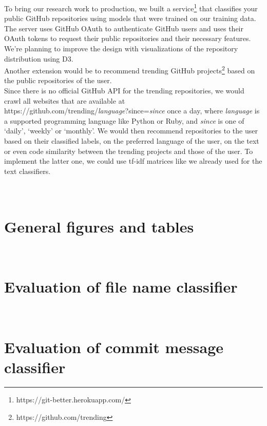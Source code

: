\documentclass[%
a4paper,
DIV12,
2.5headlines,
bigheadings,
titlepage,
openbib,
]{scrartcl}
\begin{document}
To bring our research work to production, we built a service\footnote{https://git-better.herokuapp.com/} that classifies your public GitHub repositories using models that were trained on our training data.
The server uses GitHub OAuth to authenticate GitHub users and uses their OAuth tokens to request their public repositories and their necessary features.
We're planning to improve the design with visualizations of the repository distribution using D3.\\
Another extension would be to recommend trending GitHub projects\footnote{https://github.com/trending} based on the public repositories of the user.\\
Since there is no official GitHub API for the trending repositories, we would crawl all websites that are available at \\
https://github.com/trending/\textit{language}?since=\textit{since} once a day, where \textit{language} is a supported programming language like Python or Ruby, and \textit{since} is one of `daily', `weekly' or `monthly'.
We would then recommend repositories to the user based on their classified labels, on the preferred language of the user, on the text or even code similarity between the trending projects and those of the user.
To implement the latter one, we could use tf-idf matrices like we already used for the text classifiers.


\newpage
\appendix
\section{\\General figures and tables} \label{App:AppendixA}

\FloatBarrier

\FloatBarrier

\newpage
\section{\\Evaluation of file name classifier} \label{App:AppendixB}

\FloatBarrier

\FloatBarrier

\newpage
\section{\\Evaluation of commit message classifier} \label{App:AppendixC}
\end{document}
